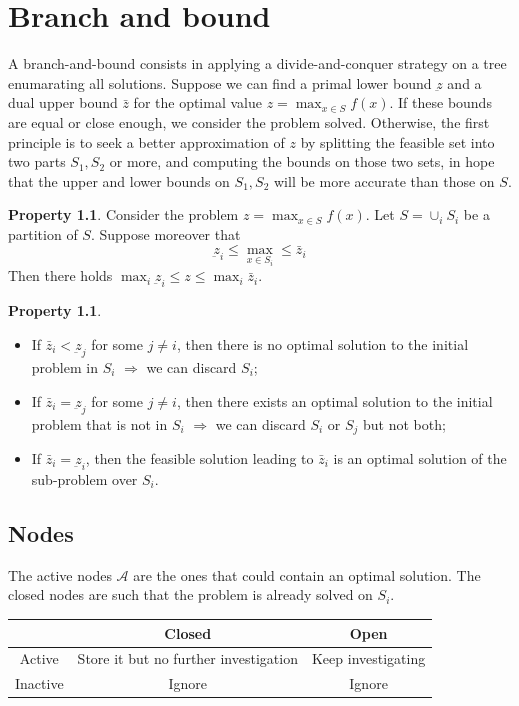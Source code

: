 \documentclass[11pt, openany]{report}
\theoremstyle{definition}
\newtheorem{prop}[thm]{Property}
\begin{document}
\chapter{Branch and bound}
A branch-and-bound consists in applying a divide-and-conquer strategy on a tree enumarating all solutions. Suppose we can find a primal lower bound $\underbar z$ and a dual upper bound $\bar z$ for the optimal value $z=\max_{x\in S}f(x)$. If these bounds are equal or close enough, we consider the problem solved. Otherwise, the first principle is to seek a better approximation of $z$ by splitting the feasible set into two parts $S_1,S_2$ or more, and computing the bounds on those two sets, in hope that the upper and lower bounds on $S_1,S_2$ will be more accurate than those on $S$.
\begin{prop}
    Consider the problem $z=\max_{x\in S} f(x)$. Let $S = \cup_i S_i$ be a partition of $S$. Suppose moreover that 
    \begin{equation}
        \underbar z_i \le \max_{x\in S_i} \le \bar z_i
    \end{equation}
    Then there holds $\max_i \underbar z_i \le z \le \max_i \bar z_i$.
\end{prop}
\begin{prop}
    \begin{itemize}
        \item If $\bar z_i<\underbar z_j$ for some $j\neq i$, then there is no optimal solution to the initial problem in $S_i$ $\Longrightarrow$ we can discard $S_i$;
        \item If $\bar z_i = \underbar z_j$ for some $j\neq i$, then there exists an optimal solution to the initial problem that is not in $S_i$ $\Longrightarrow$ we can discard $S_i$ or $S_j$ but not both;
        \item If $\bar z_i = \underbar z_i$, then the feasible solution leading to $\bar z_i$ is an optimal solution of the sub-problem over $S_i$. 
    \end{itemize}
\end{prop}
\section{Nodes}
The active nodes $\mathcal{A}$ are the ones that could contain an optimal solution. The closed nodes are such that the problem is already solved on $S_i$.
\begin{center}
    \begin{tabular}{c|c|c}
        & Closed & Open\\ \hline 
        Active & Store it but no further investigation & Keep investigating\\\hline 
        Inactive & Ignore & Ignore 
    \end{tabular}
\end{center}
\end{document}
